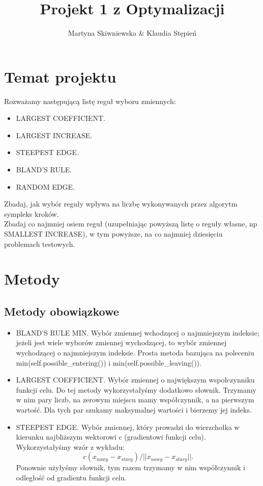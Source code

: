 \documentclass[a4paper]{article}
\title{Projekt 1 z Optymalizacji}
\author{Martyna Skiwniewska \& Klaudia Stępień }
\begin{document}
\maketitle

\section{Temat projektu}
Rozważamy następującą listę reguł wyboru zmiennych:
\begin{itemize}
\item LARGEST COEFFICIENT.
\item LARGEST INCREASE. 
\item  STEEPEST EDGE. 
\item  BLAND'S RULE.
\item  RANDOM EDGE. 
\end{itemize}
Zbadaj, jak wybór reguły wpływa na liczbę wykonywanych przez algorytm sympleks kroków.\\
Zbadaj co najmniej osiem reguł (uzupełniając powyższą listę o reguły własne, np SMALLEST INCREASE), w tym powyższe, na co najmniej dziesięciu problemach testowych.
\section{Metody}
\subsection{Metody obowiązkowe}
\begin{itemize}
\item  BLAND'S RULE MIN.  Wybór zmiennej wchodzącej o najmniejszym indeksie; jeżeli jest wiele wyborów zmiennej wychodzącej, to wybór zmiennej wychodzącej o najmniejszym indeksie. Prosta metoda bazująca na poleceniu min(self.possible\_entering()) i min(self.possible\_leaving()).
\item  LARGEST COEFFICIENT.  Wybór zmiennej o największym wspołczynniku funkcji celu. Do tej metody wykorzystałyśmy dodatkowo słownik. Trzymamy w nim pary liczb, na zerowym miejscu mamy współczynnik, a na pierwszym wartość. Dla tych par szukamy maksymalnej wartości i bierzemy jej indeks.
\item STEEPEST EDGE. Wybór zmiennej, który prowadzi do wierzchołka w kierunku najbliższym wektorowi c (gradientowi funkcji celu). Wykorzystałyśmy wzór z wykładu: 
\begin{equation*}c(x_{nowy}-x_{stary})/||x_{nowy}-x_{stary}||.
\end{equation*} 
Ponownie użyłyśmy słownik, tym razem trzymamy w nim współczynnik i odległość od gradientu funkcji celu.
\end{itemize}
\end{document}
